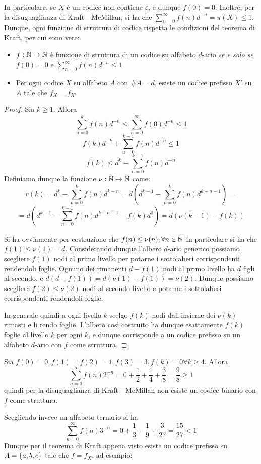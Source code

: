 \begin{observation}{}
  In particolare, se \(X\) è un codice non contiene \(\varepsilon\), e dunque \(f(0) = 0\).
  Inoltre, per la disuguaglianza di Kraft---McMillan, si ha che \(\sum_{n=0}^\infty f(n)d^{-n} = \pi(X) \leq 1\).
  Dunque, ogni funzione di struttura di codice rispetta le condizioni del teorema di Kraft, per cui sono vere:

  \begin{itemize}
    \item \(f: \mathbb{N} \to \mathbb{N}\) è funzione di struttura di un codice su alfabeto \(d\)-ario \textit{se e solo se} \(f(0) = 0\) e \(\sum_{n=0}^\infty f(n)d^{-n} \leq 1\)
    \item Per ogni codice \(X\) su alfabeto \(A\) con \(\#A = d\), esiste un codice prefisso \(X'\) su \(A\) tale che \(f_X = f_{X'}\)
  \end{itemize}
  
\end{observation}

\begin{proof}
  Sia \(k \geq 1\). Allora 
  \[\sum_{n=0}^{k}f(n)d^{-n} \leq \sum_{n=0}^{\infty}f(0)d^{-n} \leq 1 \]
  \[ f(k)d^{-k} + \sum_{n=0}^{k-1}f(n)d^{-n} \leq 1\]
  \[ f(k)\leq d^{k}-\sum_{n=0}^{k-1}f(n)d^{-n}\]
  Definiamo dunque la funzione \(\nu: \mathbb{N} \to \mathbb{N}\) come:
  \[v(k)=d^k-\sum_{n=0}^{k}f(n)d^{k-n} = d(d^{k-1}-\sum_{n=0}^{k}f(n)d^{k-n-1}) = \]
  \[= d(d^{k-1}-\sum_{n=0}^{k-1}f(n)d^{k-n-1}-f(k)d^{0}) = d(\nu(k-1)-f(k))\]

  Si ha ovviamente per costruzione che \(f(n)\leq\nu(n), \forall n \in \mathbb{N}\)
  In particolare si ha che \(f(1) \leq \nu(1) = d\).
  Considerando dunque l'albero \(d\)-ario generico possiamo scegliere \(f(1)\) nodi al primo livello per potarne i sottolaberi corrispondenti rendendoli foglie.
  Ognuno dei rimanenti \(d - f(1)\) nodi al primo livello ha \(d\) figli al secondo, e \(d(d-f(1))=d(\nu(1)- f(1)) = \nu(2)\).
  Dunque possiamo scegliere \(f(2) \leq \nu(2)\) nodi al secondo livello e potarne i sottolaberi corrispondenti rendendoli foglie.

  In generale quindi a ogni livello \(k\) scelgo \(f(k)\) nodi dall'insieme dei \(\nu(k)\) rimasti e li rendo foglie.
  L'albero così costruito ha dunque esattamente \(f(k)\) foglie al livello \(k\) per ogni \(k\), e dunque corrisponde a un codice prefisso su un alfabeto \(d\)-ario con \(f\) come struttura.
\end{proof}

\begin{example}{}
  Sia \(f(0) = 0, f(1) = f(2) =1, f(3) = 3, f(k) = 0 \forall k \geq 4\).
  Allora 
  \[\sum_{n=0}^\infty f(n)2^{-n} = 0 + \frac{1}{2} + \frac{1}{4} + \frac{3}{8} = \frac{9}{8} \geq 1\]
  quindi per la disuguaglianza di Kraft---McMillan non esiste un codice binario con \(f\) come struttura.

  Scegliendo invece un alfabeto ternario si ha
  \[\sum_{n=0}^{\infty}f(n)3^{-n} = 0 + \frac{1}{3} + \frac{1}{9} + \frac{3}{27} = \frac{15}{27} < 1\]
  Dunque per il teorema di Kraft appena visto esiste un codice prefisso su \(A=\set{a,b,c}\) tale che \(f=f_X\), ad esempio:
  
\end{example}

